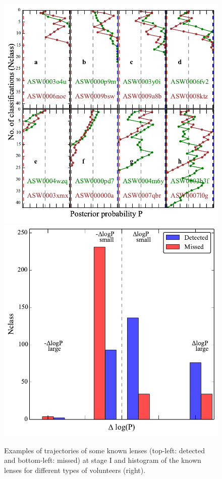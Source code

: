\documentclass[useAMS,usenatbib,a4paper]{mn2e}
\begin{document}
\begin{figure}
\begin{center}
\includegraphics[scale=0.6]{sw-cfhtls-figs/det_mis_traj.pdf}
\includegraphics[scale=0.6]{sw-cfhtls-figs/det_mis_hist.pdf}
\caption{ \label{fig:detmis}
Examples of trajectories of some known lenses (top-left: detected and
bottom-left: missed) at stage I and histogram of the known lenses for
different types of volunteers (right).
}
\end{center}
\end{figure}
\end{document}
